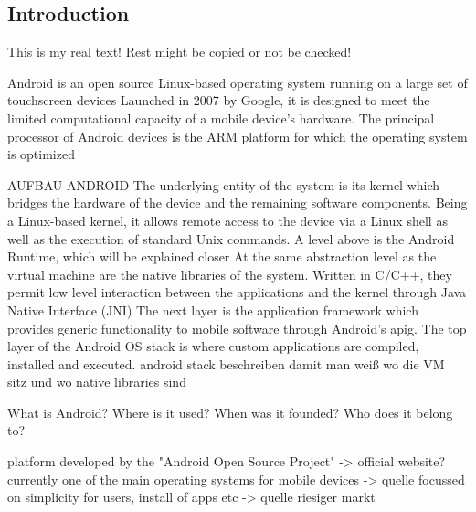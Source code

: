 \subsection{Introduction} \label{subsection:android-introduction}
This is my real text! Rest might be copied or not be checked!

%
Android is an open source Linux-based operating system running on a large set of touchscreen devices\newline
Launched in 2007 by Google, it is designed to meet the limited computational capacity of a mobile device’s hardware. The principal processor of Android devices is the ARM platform for which the operating system is optimized\newline

AUFBAU ANDROID
The underlying entity of the system is its kernel which bridges the hardware of the device and the remaining software components. Being a Linux-based kernel, it allows remote access to the device via a Linux shell as well as the execution of standard Unix commands.\newline
A level above is the Android Runtime, which will be explained closer\newline
At the same abstraction level as the virtual machine are the native libraries of the system. Written in C/C++, they permit low level interaction between the applications and the kernel through Java Native Interface (JNI)\newline
The next layer is the application framework which provides generic functionality to mobile software through Android’s  \gls{apig}.
The top layer of the Android OS stack is where custom applications are compiled, installed and executed.\newline
\cite{kovachevaMaster}
%
android stack beschreiben damit man weiß wo die VM sitz und wo native libraries sind


What is Android? Where is it used? When was it founded? Who does it belong to?\newline


platform developed by the "Android Open Source Project" -> official website?\newline
currently one of the main operating systems for mobile devices -> quelle\newline
focussed on simplicity for users, install of apps etc -> quelle\newline
riesiger markt\newline

